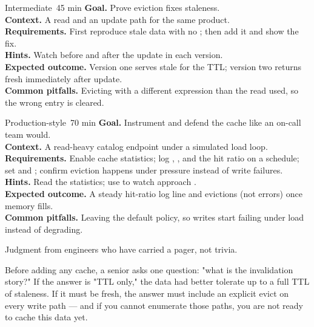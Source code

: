 \begin{minilab}{Intermediate}{~45 min}
\textbf{Goal.} Prove eviction fixes staleness.\\
\textbf{Context.} A read and an update path for the same product.\\
\textbf{Requirements.} First reproduce stale data with no ; then add it and show the fix.\\
\textbf{Hints.} Watch  before and after the update in each version.\\
\textbf{Expected outcome.} Version one serves stale for the TTL; version two returns fresh immediately after update.\\
\textbf{Common pitfalls.} Evicting with a different  expression than the read used, so the wrong entry is cleared.
\end{minilab}

\begin{minilab}{Production-style}{~70 min}
\textbf{Goal.} Instrument and defend the cache like an on-call team would.\\
\textbf{Context.} A read-heavy catalog endpoint under a simulated load loop.\\
\textbf{Requirements.} Enable cache statistics; log , , and the hit ratio on a schedule; set  and ; confirm eviction happens under pressure instead of write failures.\\
\textbf{Hints.} Read the  statistics; use  to watch  approach .\\
\textbf{Expected outcome.} A steady hit-ratio log line and evictions (not errors) once memory fills.\\
\textbf{Common pitfalls.} Leaving the default  policy, so writes start failing under load instead of degrading.
\end{minilab}


Judgment from engineers who have carried a pager, not trivia.

\begin{seniornote}
Before adding any cache, a senior asks one question: "what is the invalidation story?" If the answer is "TTL only," the data had better tolerate up to a full TTL of staleness. If it must be fresh, the answer must include an explicit evict on every write path --- and if you cannot enumerate those paths, you are not ready to cache this data yet.
\end{seniornote}

